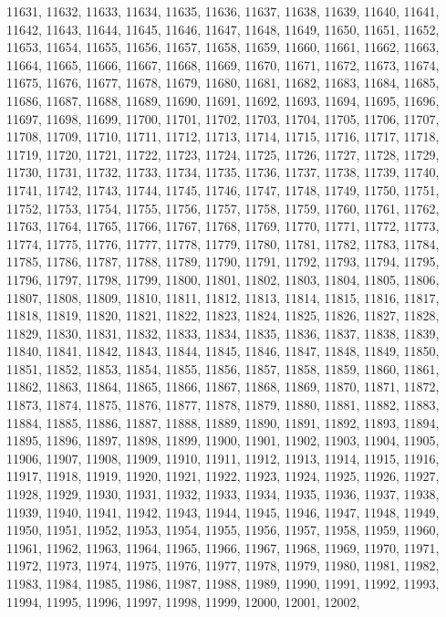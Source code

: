 11631,
11632,
11633,
11634,
11635,
11636,
11637,
11638,
11639,
11640,
11641,
11642,
11643,
11644,
11645,
11646,
11647,
11648,
11649,
11650,
11651,
11652,
11653,
11654,
11655,
11656,
11657,
11658,
11659,
11660,
11661,
11662,
11663,
11664,
11665,
11666,
11667,
11668,
11669,
11670,
11671,
11672,
11673,
11674,
11675,
11676,
11677,
11678,
11679,
11680,
11681,
11682,
11683,
11684,
11685,
11686,
11687,
11688,
11689,
11690,
11691,
11692,
11693,
11694,
11695,
11696,
11697,
11698,
11699,
11700,
11701,
11702,
11703,
11704,
11705,
11706,
11707,
11708,
11709,
11710,
11711,
11712,
11713,
11714,
11715,
11716,
11717,
11718,
11719,
11720,
11721,
11722,
11723,
11724,
11725,
11726,
11727,
11728,
11729,
11730,
11731,
11732,
11733,
11734,
11735,
11736,
11737,
11738,
11739,
11740,
11741,
11742,
11743,
11744,
11745,
11746,
11747,
11748,
11749,
11750,
11751,
11752,
11753,
11754,
11755,
11756,
11757,
11758,
11759,
11760,
11761,
11762,
11763,
11764,
11765,
11766,
11767,
11768,
11769,
11770,
11771,
11772,
11773,
11774,
11775,
11776,
11777,
11778,
11779,
11780,
11781,
11782,
11783,
11784,
11785,
11786,
11787,
11788,
11789,
11790,
11791,
11792,
11793,
11794,
11795,
11796,
11797,
11798,
11799,
11800,
11801,
11802,
11803,
11804,
11805,
11806,
11807,
11808,
11809,
11810,
11811,
11812,
11813,
11814,
11815,
11816,
11817,
11818,
11819,
11820,
11821,
11822,
11823,
11824,
11825,
11826,
11827,
11828,
11829,
11830,
11831,
11832,
11833,
11834,
11835,
11836,
11837,
11838,
11839,
11840,
11841,
11842,
11843,
11844,
11845,
11846,
11847,
11848,
11849,
11850,
11851,
11852,
11853,
11854,
11855,
11856,
11857,
11858,
11859,
11860,
11861,
11862,
11863,
11864,
11865,
11866,
11867,
11868,
11869,
11870,
11871,
11872,
11873,
11874,
11875,
11876,
11877,
11878,
11879,
11880,
11881,
11882,
11883,
11884,
11885,
11886,
11887,
11888,
11889,
11890,
11891,
11892,
11893,
11894,
11895,
11896,
11897,
11898,
11899,
11900,
11901,
11902,
11903,
11904,
11905,
11906,
11907,
11908,
11909,
11910,
11911,
11912,
11913,
11914,
11915,
11916,
11917,
11918,
11919,
11920,
11921,
11922,
11923,
11924,
11925,
11926,
11927,
11928,
11929,
11930,
11931,
11932,
11933,
11934,
11935,
11936,
11937,
11938,
11939,
11940,
11941,
11942,
11943,
11944,
11945,
11946,
11947,
11948,
11949,
11950,
11951,
11952,
11953,
11954,
11955,
11956,
11957,
11958,
11959,
11960,
11961,
11962,
11963,
11964,
11965,
11966,
11967,
11968,
11969,
11970,
11971,
11972,
11973,
11974,
11975,
11976,
11977,
11978,
11979,
11980,
11981,
11982,
11983,
11984,
11985,
11986,
11987,
11988,
11989,
11990,
11991,
11992,
11993,
11994,
11995,
11996,
11997,
11998,
11999,
12000,
12001,
12002,
